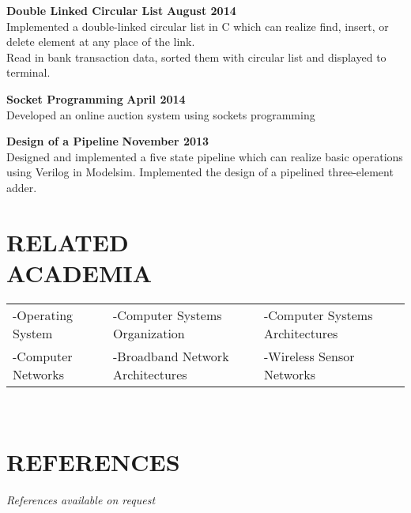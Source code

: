 \documentclass[margin,line]{resume}
\begin{document}
\begin{resume}
    \textbf{\listing Double Linked Circular List} \hfill \textbf{August 2014}\vspace{-3mm}\\\vspace{-1mm}%
    Implemented a double-linked circular list in C which can realize find, insert, or delete element at any place of the link. \vspace{1mm}\\
    Read in bank transaction data, sorted them with circular list and displayed to terminal.

    \textbf{\listing Socket Programming} \hfill \textbf{April 2014}\vspace{-3mm}\\\vspace{-1mm}%
    Developed an online auction system using sockets programming \vspace{1mm}

    \textbf{\listing Design of a Pipeline} \hfill \textbf{November 2013}\vspace{-3mm}\\\vspace{-1mm}%
    Designed and implemented a five state pipeline which can realize basic operations using Verilog in Modelsim.
	Implemented the design of a pipelined three-element adder. \vspace{1mm}          
\sectionline

    \section{\mysidestyle \textbf{\large{R}\small{ELATED\\ACADEMIA}}} 

	\vspace{1mm} %
	\begin{tabular}{@{}p{5cm}p{5cm}p{5cm}}
	-Operating System     &  -Computer Systems Organization         &  -Computer Systems Architectures\\
	-Computer Networks    &  -Broadband Network Architectures       &  -Wireless Sensor Networks\\
	\end{tabular}
	\vspace{2mm} \\
	
\sectionline

\section{\mysidestyle \textbf{\large{R}\small{EFERENCES}}}

    \textsl{References available on request}

\end{resume}
\end{document}
